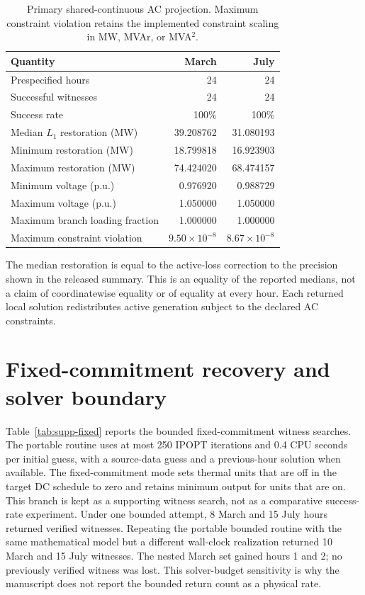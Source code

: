 \documentclass[10pt,journal,onecolumn]{IEEEtran}
\begin{document}
\begin{table}[t]
\centering
\caption{Primary shared-continuous AC projection. Maximum constraint violation retains the implemented constraint scaling in MW, MVAr, or MVA$^2$.}
\label{tab:supp-ac}
\begin{tabular}{lrr}
\toprule
Quantity & March & July\\
\midrule
Prespecified hours & 24 & 24\\
Successful witnesses & 24 & 24\\
Success rate & 100\% & 100\%\\
Median $L_1$ restoration (MW) & 39.208762 & 31.080193\\
Minimum restoration (MW) & 18.799818 & 16.923903\\
Maximum restoration (MW) & 74.424020 & 68.474157\\
Minimum voltage (p.u.) & 0.976920 & 0.988729\\
Maximum voltage (p.u.) & 1.050000 & 1.050000\\
Maximum branch loading fraction & 1.000000 & 1.000000\\
Maximum constraint violation & $9.50\times10^{-8}$ & $8.67\times10^{-8}$\\
\bottomrule
\end{tabular}
\end{table}

The median restoration is equal to the active-loss correction to the precision shown in the released summary. This is an equality of the reported medians, not a claim of coordinatewise equality or of equality at every hour. Each returned local solution redistributes active generation subject to the declared AC constraints.

\section{Fixed-commitment recovery and solver boundary}
Table~\ref{tab:supp-fixed} reports the bounded fixed-commitment witness searches. The portable routine uses at most 250 IPOPT iterations and 0.4 CPU seconds per initial guess, with a source-data guess and a previous-hour solution when available.
The fixed-commitment mode sets thermal units that are off in the target DC schedule to zero and retains minimum output for units that are on. This branch is kept as a supporting witness search, not as a comparative success-rate experiment. Under one bounded attempt, 8 March and 15 July hours returned verified witnesses. Repeating the portable bounded routine with the same mathematical model but a different wall-clock realization returned 10 March and 15 July witnesses. The nested March set gained hours 1 and 2; no previously verified witness was lost. This solver-budget sensitivity is why the manuscript does not report the bounded return count as a physical rate.
\end{document}
